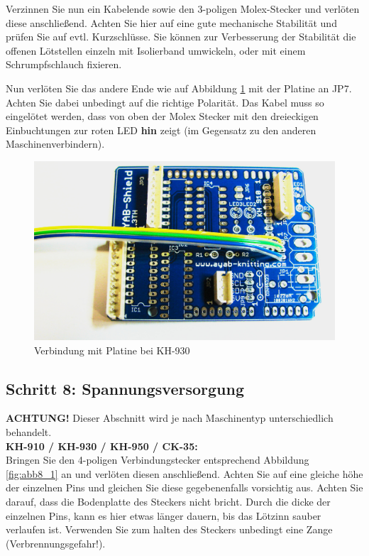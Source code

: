 \documentclass[fleqn,10pt]{SelfArx} %
\begin{document}
Verzinnen Sie nun ein Kabelende sowie den 3-poligen Molex-Stecker und verlöten diese anschließend. Achten Sie hier auf eine gute mechanische Stabilität und prüfen Sie auf evtl. Kurzschlüsse. Sie können zur Verbesserung der Stabilität die offenen Lötstellen einzeln mit Isolierband umwickeln, oder mit einem Schrumpfschlauch fixieren.

Nun verlöten Sie das andere Ende wie auf Abbildung \ref{fig:abb7_7} mit der Platine an JP7. Achten Sie dabei unbedingt auf die richtige Polarität. Das Kabel muss so eingelötet werden, dass von oben der Molex Stecker mit den dreieckigen Einbuchtungen zur roten LED \textbf{hin} zeigt (im Gegensatz zu den anderen Maschinenverbindern).

\begin{figure}[tbhp]\centering
\includegraphics[width=\linewidth]{abb7_7}
\caption{Verbindung mit Platine bei KH-930}
\label{fig:abb7_7}
\end{figure}

\FloatBarrier

 \subsection*{Schritt 8: Spannungsversorgung}

\textbf{ACHTUNG!} Dieser Abschnitt wird je nach Maschinentyp unterschiedlich behandelt.\\

\textbf{KH-910 / KH-930 / KH-950 / CK-35:} \\

Bringen Sie den 4-poligen Verbindungstecker entsprechend Abbildung \ref{fig:abb8_1} an und verlöten diesen anschließend. Achten Sie auf eine gleiche höhe der einzelnen Pins und gleichen Sie diese gegebenenfalls vorsichtig aus. Achten Sie darauf, dass die Bodenplatte des Steckers nicht bricht. Durch die dicke der einzelnen Pins, kann es hier etwas länger dauern, bis das Lötzinn sauber verlaufen ist. Verwenden Sie zum halten des Steckers unbedingt eine Zange (Verbrennungsgefahr!).
\end{document}
